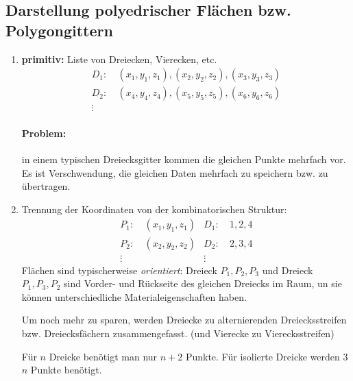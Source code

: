 \subsection{Darstellung polyedrischer Flächen bzw. Polygongittern}
\begin{enumerate}
 \item \textbf{primitiv:} Liste von Dreiecken, Vierecken, etc.
\begin{align*}
 D_1:\ &(x_1,y_1,z_1),(x_2,y_2,z_2),(x_3,y_3,z_3)\\
 D_2:\ &(x_4,y_4,z_4),(x_5,y_5,z_5),(x_6,y_6,z_6)\\
 \vdots\ 
\end{align*}
\begin{center}
\end{center}
\paragraph*{Problem:} in einem typischen Dreiecksgitter kommen die gleichen Punkte mehrfach vor. Es ist
	Verschwendung, die gleichen Daten mehrfach zu speichern bzw. zu übertragen.
\item	Trennung der Koordinaten von der kombinatorischen Struktur:
	\begin{align*}
	 P_1:\ &(x_1,y_1,z_1) & D_1:\ &1,2,4\\
	 P_2:\ &(x_2,y_2,z_2) & D_2:\ &2,3,4\\
	 \vdots\ &		& \vdots\ 
	\end{align*}
	Flächen sind typischerweise \emph{orientiert}: Dreieck $P_1,P_2,P_3$ und Dreieck $P_1,P_3,P_2$ sind Vorder-
	und Rückseite des gleichen Dreiecks im Raum, un sie können unterschiedliche Materialeigenschaften haben.
	\begin{center}
	\end{center}
	Um noch mehr zu sparen, werden Dreiecke zu alternierenden Dreiecksstreifen bzw. Dreiecksfächern zusammengefasst.
	(und Vierecke zu Vierecksstreifen)
	\begin{center}
	\end{center}
	Für $n$ Dreicke benötigt man nur $n+2$ Punkte. Für isolierte Dreicke werden 3$n$ Punkte benötigt.
\end{enumerate}
